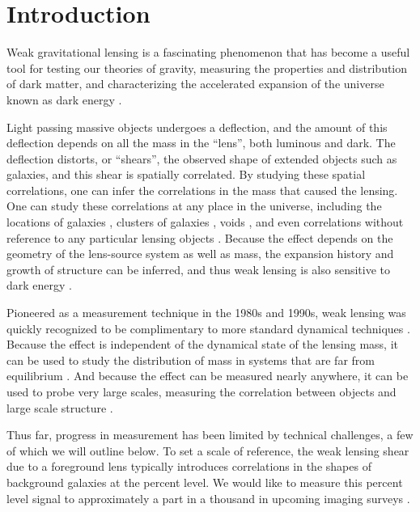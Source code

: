 \documentclass[iop]{emulateapj}
\begin{document}

\section{Introduction} \label{sec:intro}

Weak gravitational lensing is a fascinating phenomenon that has become a useful
tool for testing our theories of gravity, measuring the properties and
distribution of dark matter, and characterizing the accelerated expansion 
of the universe known as dark energy \citep[for a review, see][]{HoekstraJain2008}.

Light passing massive objects undergoes a deflection, and the amount of this
deflection depends on all the mass in the ``lens'', both luminous and dark.
The deflection distorts, or ``shears'', the observed shape of extended objects
such as galaxies, and this shear is spatially correlated.  By studying these
spatial correlations, one can infer the correlations in the mass that caused the
lensing. One can study these correlations at any place in the universe,
including the locations of galaxies \citep{Mandelbaum06}, clusters of galaxies
\citep{JohnstonLensing07}, voids \citep{MelchiorVoids2014}, and even
correlations without reference to any particular lensing objects
\citep{CFHTCosmicShear2013}.  Because the effect depends on the geometry of the
lens-source system as well as mass, the expansion history and growth of
structure can be inferred, and thus weak lensing is also sensitive to dark
energy \citep{HeymansTomography2013}.


Pioneered as a measurement technique in the 1980s and 1990s, weak lensing was
quickly recognized to be complimentary to more standard dynamical techniques
\citep{Tyson84}.  Because the effect is independent of the dynamical state of
the lensing mass, it can be used to study the distribution of mass in systems
that are far from equilibrium \citep{CloweDMProof06}.   And because the effect
can be measured nearly anywhere, it can be used to probe very large scales,
measuring the correlation between objects and large scale structure
\citep{SheldonLensing09}.

Thus far, progress in measurement has been limited by technical challenges, a
few of which we will outline below.  To set a scale of reference, the weak
lensing shear due to a foreground lens typically introduces correlations in the
shapes of background galaxies at the percent level.    We would like to measure
this percent level signal to approximately a part in a thousand in upcoming
imaging surveys \citep{HutererSystematics06}.
\end{document}

